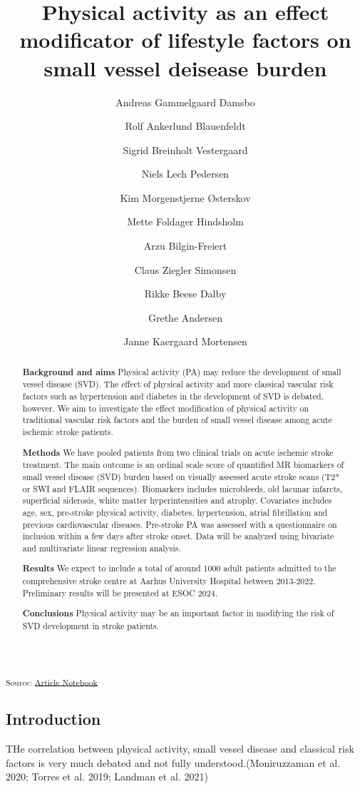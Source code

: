 \documentclass[
  letterpaper,
  DIV=11,
  numbers=noendperiod]{scrartcl}
\title{Physical activity as an effect modificator of lifestyle factors
on small vessel deisease burden}
\author{Andreas Gammelgaard Damsbo \and Rolf Ankerlund
Blauenfeldt \and Sigrid Breinholt Vestergaard \and Niels Lech
Pedersen \and Kim Morgenstjerne Østerskov \and Mette Foldager
Hindsholm \and Arzu Bilgin-Freiert \and Claus Ziegler
Simonsen \and Rikke Beese Dalby \and Grethe Andersen \and Janne
Kaergaard Mortensen}
\date{}
\begin{document}
\maketitle
\begin{abstract}
\textbf{Background and aims} Physical activity (PA) may reduce the
development of small vessel disease (SVD). The effect of physical
activity and more classical vascular risk factors such as hypertension
and diabetes in the development of SVD is debated, however. We aim to
investigate the effect modification of physical activity on traditional
vascular risk factors and the burden of small vessel disease among acute
ischemic stroke patients.

\textbf{Methods} We have pooled patients from two clinical trials on
acute ischemic stroke treatment. The main outcome is an ordinal scale
score of quantified MR biomarkers of small vessel disease (SVD) burden
based on visually assessed acute stroke scans (T2* or SWI and FLAIR
sequences). Biomarkers includes microbleeds, old lacunar infarcts,
superficial siderosis, white matter hyperintensities and atrophy.
Covariates includes age, sex, pre-stroke physical activity, diabetes,
hypertension, atrial fibrillation and previous cardiovascular diseases.
Pre-stroke PA was assessed with a questionnaire on inclusion within a
few days after stroke onset. Data will be analyzed using bivariate and
multivariate linear regression analysis.

\textbf{Results} We expect to include a total of around 1000 adult
patients admitted to the comprehensive stroke centre at Aarhus
University Hospital between 2013-2022. Preliminary results will be
presented at ESOC 2024.

\textbf{Conclusions} Physical activity may be an important factor in
modifying the risk of SVD development in stroke patients.
\end{abstract}

\textsubscript{Source:
\href{https://agdamsbo.github.io/svd-modification/index.qmd.html}{Article
Notebook}}

\subsection{Introduction}\label{introduction}

THe correlation between physical activity, small vessel disease and
classical risk factors is very much debated and not fully
understood.(Moniruzzaman et al. 2020; Torres et al. 2019; Landman et al.
2021)
\end{document}

